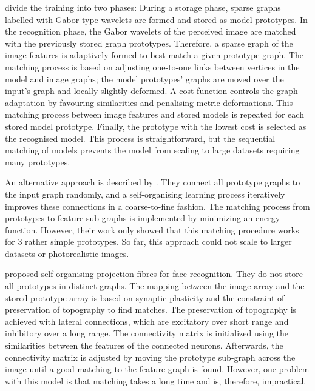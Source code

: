  divide the training into two phases: During a storage phase, sparse graphs labelled with Gabor-type wavelets are formed and stored as model prototypes. In the recognition phase, the Gabor wavelets of the perceived image are matched with the previously stored graph prototypes.
Therefore, a sparse graph of the image features is adaptively formed to best match a given prototype graph. The matching process is based on adjusting one-to-one links between vertices in the model and image graphs; the model prototypes' graphs are moved over the input's graph and locally slightly deformed. A cost function controls the graph adaptation by favouring similarities and penalising metric deformations. This matching process between image features and stored models is repeated for each stored model prototype. Finally, the prototype with the lowest cost is selected as the recognised model. This process is straightforward, but the sequential matching of models prevents the model from scaling to large datasets requiring many prototypes.

An alternative approach is described by . They connect all prototype graphs to the input graph randomly, and a self-organising learning process iteratively improves these connections in a coarse-to-fine fashion.
The matching process from prototypes to feature sub-graphs is implemented by minimizing an energy function.
However, their work only showed that this matching procedure works for $3$ rather simple prototypes.
So far, this approach could not scale to larger datasets or photorealistic images.

 proposed self-organising projection fibres for face recognition. They do not store all prototypes in distinct graphs. The mapping between the image array and the stored prototype array is based on synaptic plasticity and the constraint of preservation of topography to find matches. The preservation of topography is achieved with lateral connections, which are excitatory over short range and inhibitory over a long range.
The connectivity matrix is initialized using the similarities between the features of the connected neurons. Afterwards, the connectivity matrix is adjusted by moving the prototype sub-graph across the image until a good matching to the feature graph is found.
However, one problem with this model is that matching takes a long time and is, therefore, impractical.

